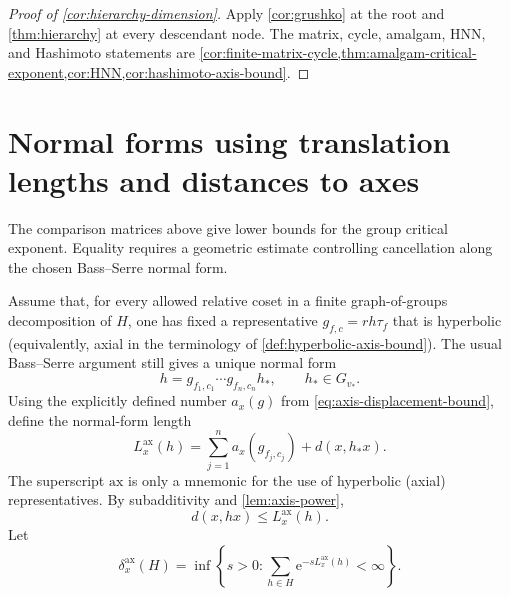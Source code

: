 \documentclass[11pt]{article}
\theoremstyle{definition}
\newcommand{\ax}{\mathrm{ax}}
\newcommand{\e}{\mathrm e}
\begin{document}
\begin{proof}[Proof of \cref{cor:hierarchy-dimension}]
Apply \cref{cor:grushko} at the root and \cref{thm:hierarchy} at every descendant node.
The matrix, cycle, amalgam, HNN, and Hashimoto statements are
\cref{cor:finite-matrix-cycle,thm:amalgam-critical-exponent,cor:HNN,cor:hashimoto-axis-bound}.
\end{proof}

\section{Normal forms using translation lengths and distances to axes}
\label{sec:bounded-cancellation}

The comparison matrices above give lower bounds for the group critical exponent.  Equality
requires a geometric estimate controlling cancellation along the chosen Bass--Serre normal
form.

Assume that, for every allowed relative coset in a finite graph-of-groups decomposition of
$H$, one has fixed a representative $g_{f,c}=rh\tau_f$ that is hyperbolic (equivalently,
axial in the terminology of \cref{def:hyperbolic-axis-bound}).  The usual Bass--Serre argument still
gives a unique normal form
\[
 h=g_{f_1,c_1}\cdots g_{f_n,c_n}h_*,
 \qquad h_*\in G_{v_*}.
\]
Using the explicitly defined number $a_x(g)$ from \eqref{eq:axis-displacement-bound}, define the normal-form length
\begin{equation}\label{eq:axis-normal-form-length}
 L^{\ax}_x(h)
 =\sum_{j=1}^n a_x(g_{f_j,c_j})+d(x,h_*x).
\end{equation}
The superscript $\ax$ is only a mnemonic for the use of hyperbolic (axial) representatives.
By subadditivity and
\cref{lem:axis-power},
\begin{equation}\label{eq:axis-normal-form-upper}
 d(x,hx)\le L^{\ax}_x(h).
\end{equation}
Let
\[
 \delta^{\ax}_x(H)=
 \inf\left\{s>0:\sum_{h\in H}\e^{-sL^{\ax}_x(h)}<\infty\right\}.
\]
\end{document}
